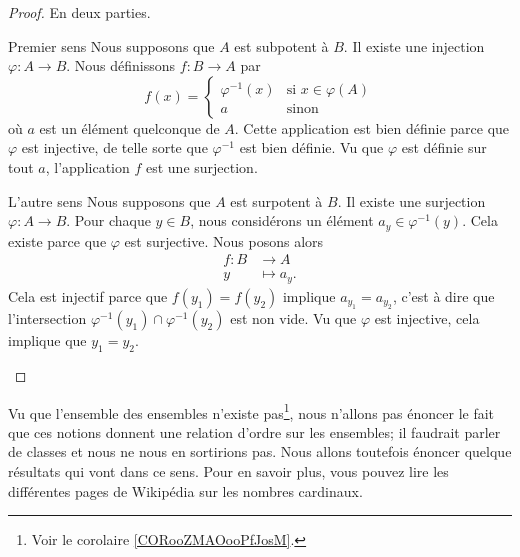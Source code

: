 \begin{proof}
    En deux parties.
    \begin{subproof}
        \item[Premier sens]
            Nous supposons que \( A\) est subpotent à \( B\). Il existe une injection \( \varphi\colon A\to B\). Nous définissons \( f\colon B\to A\) par
            \begin{equation}
                f(x)=\begin{cases}
                    \varphi^{-1}(x)    &   \text{si } x\in\varphi(A)\\
                    a    &    \text{sinon } 
                \end{cases}
            \end{equation}
            où \( a\) est un élément quelconque de \( A\). Cette application est bien définie parce que \( \varphi\) est injective, de telle sorte que \( \varphi^{-1}\) est bien définie. Vu que \( \varphi\) est définie sur tout \( a\), l'application \( f\) est une surjection.
        \item[L'autre sens]
            Nous supposons que \( A\) est surpotent à \( B\). Il existe une surjection \( \varphi\colon A\to B\). Pour chaque \( y\in B\), nous considérons un élément \( a_y\in \varphi^{-1}(y)\). Cela existe parce que \( \varphi\) est surjective. Nous posons alors
            \begin{equation}
                \begin{aligned}
                    f\colon B&\to A \\
                    y&\mapsto a_y. 
                \end{aligned}
            \end{equation}
            Cela est injectif parce que \( f(y_1)=f(y_2)\) implique \( a_{y_1}=a_{y_2}\), c'est à dire que l'intersection \( \varphi^{-1}(y_1)\cap\varphi^{-1}(y_2)\) est non vide. Vu que \( \varphi\) est injective, cela implique que $y_1=y_2$.
    \end{subproof}
\end{proof}

Vu que l'ensemble des ensembles n'existe pas\footnote{Voir le corolaire \ref{CORooZMAOooPfJosM}.}, nous n'allons pas énoncer le fait que ces notions donnent une relation d'ordre sur les ensembles; il faudrait parler de classes et nous ne nous en sortirions pas. Nous allons toutefois énoncer quelque résultats qui vont dans ce sens. Pour en savoir plus, vous pouvez lire les différentes pages de Wikipédia sur les nombres cardinaux.


